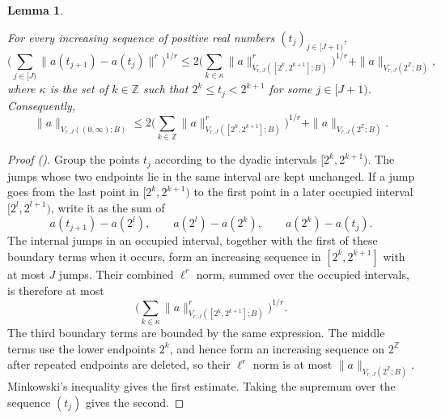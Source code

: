 \documentclass[12pt,reqno]{amsart}
\newcommand{\auto}{{({\tiny\faCar})}}
\theoremstyle{plain}
\newtheorem{lemma}[theorem]{Lemma}
\numberwithin{equation}{section}
\theoremstyle{remark}
\newcommand{\uses}[1]{}
\newcommand{\usesdefs}[1]{}
\newcommand{\leanok}{}
\newcommand{\lean}[1]{}
\newcommand{\Z}{{\mathbb Z}}
\begin{document}
\begin{lemma}\label{lem:shortlongjumps}\uses{}\usesdefs{}
\lean{Auto.shortlongJumps}
\leanok
For every increasing sequence of positive real numbers $(t_j)_{j\in[J+1)}$,
\begin{equation}\label{auto:short-long-variation-decomposition}
\Big(\sum_{j\in[J)}\|a(t_{j+1})-a(t_j)\|^r\Big)^{1/r}
\le
2\Big(\sum_{k\in\kappa}\|a\|_{V_{r,J}([2^k,2^{k+1}];B)}^r\Big)^{1/r}
+\|a\|_{V_{r,J}(2^\Z;B)},
\end{equation}
where $\kappa$ is the set of $k\in\Z$ such that $2^k\le t_j<2^{k+1}$ for some $j\in[J+1)$. Consequently,
\begin{equation}\label{auto:global-short-long-variation-bound}
\|a\|_{V_{r,J}((0,\infty);B)}
\le
2\Big(\sum_{k\in\Z}\|a\|_{V_{r,J}([2^k,2^{k+1}];B)}^r\Big)^{1/r}
+\|a\|_{V_{r,J}(2^\Z;B)}.
\end{equation}
\end{lemma}
\begin{proof}[Proof \auto]
Group the points $t_j$ according to the dyadic intervals $[2^k,2^{k+1})$. The jumps whose two endpoints lie in the same interval are kept unchanged. If a jump goes from the last point in $[2^k,2^{k+1})$ to the first point in a later occupied interval $[2^l,2^{l+1})$, write it as the sum of
\[
a(t_{j+1})-a(2^l),
\qquad
a(2^l)-a(2^k),
\qquad
a(2^k)-a(t_j).
\]
The internal jumps in an occupied interval, together with the first of these boundary terms when it occurs, form an increasing sequence in $[2^k,2^{k+1}]$ with at most $J$ jumps. Their combined $\ell^r$ norm, summed over the occupied intervals, is therefore at most
\[
\Big(\sum_{k\in\kappa}\|a\|_{V_{r,J}([2^k,2^{k+1}];B)}^r\Big)^{1/r}.
\]
The third boundary terms are bounded by the same expression. The middle terms use the lower endpoints $2^k$, and hence form an increasing sequence on $2^\Z$ after repeated endpoints are deleted, so their $\ell^r$ norm is at most $\|a\|_{V_{r,J}(2^\Z;B)}$. Minkowski's inequality gives the first estimate. Taking the supremum over the sequence $(t_j)$ gives the second.
\end{proof}
\end{document}
